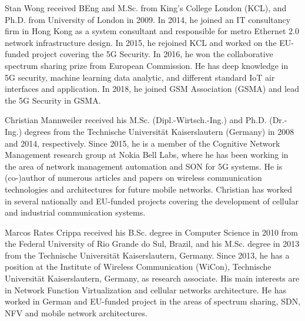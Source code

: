 \documentclass{ieeeaccess}
\newcommand{\change}[1]{#1}
\begin{document}
   \vfill
   
   \begin{IEEEbiography}
   	[{\texttt{[image: ws]}}]{Stan Wong} received BEng and M.Sc. from King's College London (KCL), and Ph.D. from University of London in 2009. In 2014, he joined an IT consultancy firm in Hong Kong as a system consultant and responsible for metro Ethernet 2.0 network infrastructure design. In 2015, he rejoined KCL and worked on the EU-funded project covering the 5G Security. In 2016, he won the collaborative spectrum sharing prize from European Commission. He has deep knowledge in 5G security, machine learning data analytic, and different standard IoT air interfaces and application. \change{In 2018, he joined GSM Association (GSMA) and lead the 5G Security in GSMA. }
   \end{IEEEbiography}
   
   
   \begin{IEEEbiography}
   	{Christian Mannweiler} received his M.Sc. (Dipl.-Wirtsch.-Ing.) and Ph.D. (Dr.-Ing.) degrees from the Technische Universit\"at Kaiserslautern (Germany) in 2008 and 2014, respectively. Since 2015, he is a member of the Cognitive Network Management research group at Nokia Bell Labs, where he has been working in the area of network management automation and SON for 5G systems. He is (co-)author of numerous articles and papers on wireless communication technologies and architectures for future mobile networks. Christian has worked in several nationally and EU-funded projects covering the development of cellular and industrial communication systems.
   \end{IEEEbiography}
   
   \vfill
   
   \begin{IEEEbiography}[{\texttt{[image: mc]}}]{Marcos Rates Crippa} received his B.Sc. degree in Computer Science in 2010 from the Federal University of Rio Grande do Sul, Brazil, and his M.Sc. degree in 2013 from the Technische Universit\"at Kaiserslautern, Germany. Since 2013, he has a position at the Institute of Wireless Communication (WiCon), Technische Universit\"at Kaiserslautern, Germany, as research associate. His main interests are in Network Function Virtualization and cellular networks architecture. He has worked in German and EU-funded project in the areas of spectrum sharing, SDN, NFV and mobile network architectures.
   \end{IEEEbiography}
   
\end{document}

